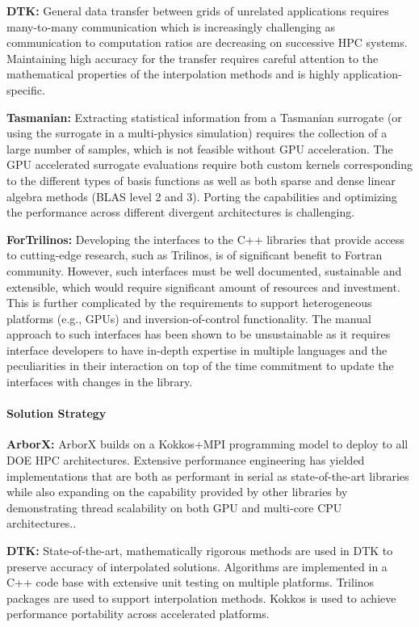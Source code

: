 {\bf DTK:} General data transfer between grids of unrelated applications
requires many-to-many communication which is increasingly challenging as
communication to computation ratios are decreasing on successive HPC systems.
Maintaining high accuracy for the transfer requires careful attention to the
mathematical properties of the interpolation methods and is highly
application-specific.

{\bf Tasmanian:} Extracting statistical information from a Tasmanian surrogate
(or using the surrogate in a multi-physics simulation) requires the collection
of a large number of samples, which is not feasible without GPU acceleration.
The GPU accelerated surrogate evaluations require both custom kernels
corresponding to the different types of basis functions as well as both
sparse and dense linear algebra methods (BLAS level 2 and 3).
Porting the capabilities and optimizing the performance across different
divergent architectures is challenging.

{\bf ForTrilinos:} Developing the interfaces to the C++ libraries that provide
access to cutting-edge research, such as Trilinos,  is of significant benefit
to Fortran community. However, such interfaces must be well documented,
sustainable and extensible, which would require significant amount of resources
and investment. This is further complicated by the requirements to support
heterogeneous platforms (e.g., GPUs) and inversion-of-control functionality.
The manual approach to such interfaces has been shown to be unsustainable as it
requires interface developers to have in-depth expertise in  multiple languages
and the peculiarities in their interaction on top of the time commitment to
update the interfaces with changes in the library.

\paragraph{Solution Strategy}

\nobreak


\indent

{\bf ArborX:} ArborX builds on a Kokkos+MPI programming model to deploy to all
DOE HPC architectures. Extensive performance engineering has yielded
implementations that are both as performant in serial as state-of-the-art
libraries while also expanding on the capability provided by other libraries
by demonstrating thread scalability on both GPU and multi-core CPU
architectures..

{\bf DTK:} State-of-the-art, mathematically rigorous methods are used in DTK
to preserve accuracy of interpolated solutions.  Algorithms are implemented in
a C++ code base with extensive unit testing on multiple platforms.  Trilinos
packages are used to support interpolation methods.  Kokkos is used to achieve
performance portability across accelerated platforms.

